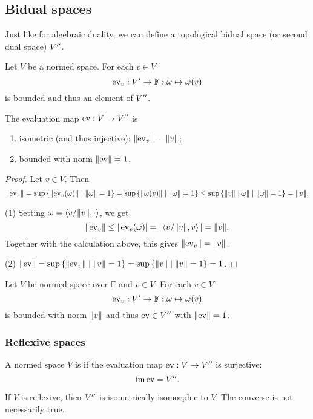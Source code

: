 \subsection{Bidual spaces}
Just like for algebraic duality, we can define a topological bidual space (or second dual space) ${V}^{\prime\prime}$.

\begin{proposition}
Let $V$ be a normed space. 
For each $v\in V$
\[ \operatorname{ev}_v: {V}^\prime \to \mathbb{F}: \omega \mapsto \omega(v) \]
is bounded and thus an element of ${V}^{\prime\prime}$.

The evaluation map $\operatorname{ev}: V \to {V}^{\prime\prime}$ is
\begin{enumerate}
\item isometric (and thus injective): $\lVert\operatorname{ev}_v\rVert = \lVert v\rVert$;
\item bounded with norm $\lVert\operatorname{ev}\rVert = 1$.
\end{enumerate}
\end{proposition}
\begin{proof}
Let $v\in V$. Then
\[ \lVert\operatorname{ev}_v\rVert = \sup\left\{ \lVert\operatorname{ev}_v(\omega)\rVert \;\middle|\; \lVert\omega\rVert=1 \right\} = \sup\left\{ \lVert\omega(v)\rVert \;\middle|\; \lVert\omega\rVert=1 \right\} \leq \sup\left\{ \lVert v\rVert\;\lVert\omega\rVert \;\middle|\; \lVert\omega\rVert=1 \right\} = \lVert v\rVert. \]

(1) Setting $\omega = \left\langle v/\lVert v\rVert, \cdot \right\rangle$, we get
\[ \lVert\operatorname{ev}_v\rVert \leq |\operatorname{ev}_v(\omega)| = |\left\langle v/\lVert v\rVert, v \right\rangle| = \lVert v\rVert. \]
Together with the calculation above, this gives $\lVert\operatorname{ev}_v\rVert = \lVert v\rVert$.

(2) $\lVert\operatorname{ev}\rVert = \sup\left\{ \lVert\operatorname{ev}_v\rVert \;\middle|\; \lVert v\rVert=1 \right\} = \sup\left\{ \lVert v\rVert \;\middle|\; \lVert v\rVert=1 \right\} = 1$.
\end{proof}

\begin{lemma}
Let $V$ be normed space over $\mathbb{F}$ and $v\in V$. For each $v\in V$
\[ \operatorname{ev}_v: {V}^\prime \to \mathbb{F}: \omega \mapsto \omega(v) \]
is bounded with norm $\lVert v\rVert$ and thus $\operatorname{ev}\in {V}^{\prime\prime}$ with $\lVert\operatorname{ev}\rVert = 1$.
\end{lemma}

\subsubsection{Reflexive spaces}
\begin{definition}
A normed space $V$ is  if the evaluation map $\operatorname{ev}:V\to {V}^{\prime\prime}$ is surjective:
\[ \operatorname{im}\operatorname{ev} = {V}^{\prime\prime}. \]
\end{definition}
If $V$ is reflexive, then ${V}^{\prime\prime}$ is isometrically isomorphic to $V$. The converse is not necessarily true.

